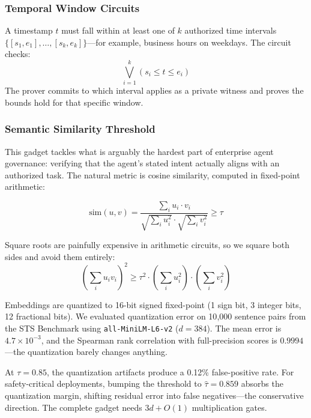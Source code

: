 \documentclass[10pt,conference]{IEEEtran}
\begin{document}
\subsubsection{Temporal Window Circuits}

A timestamp $t$ must fall within at least one of $k$ authorized time intervals $\{[s_1, e_1], \ldots, [s_k, e_k]\}$---for example, business hours on weekdays. The circuit checks:
\begin{equation}
    \bigvee_{i=1}^{k} (s_i \leq t \leq e_i)
\end{equation}
The prover commits to which interval applies as a private witness and proves the bounds hold for that specific window.

\subsubsection{Semantic Similarity Threshold}

This gadget tackles what is arguably the hardest part of enterprise agent governance: verifying that the agent's stated intent actually aligns with an authorized task. The natural metric is cosine similarity, computed in fixed-point arithmetic:

\begin{equation}
    \text{sim}(u, v) = \frac{\sum_{i} u_i \cdot v_i}{\sqrt{\sum_i u_i^2} \cdot \sqrt{\sum_i v_i^2}} \geq \tau
\end{equation}

Square roots are painfully expensive in arithmetic circuits, so we square both sides and avoid them entirely:
\begin{equation}
    \left(\sum_i u_i v_i\right)^2 \geq \tau^2 \cdot \left(\sum_i u_i^2\right) \cdot \left(\sum_i v_i^2\right)
    \label{eq:cossim}
\end{equation}

Embeddings are quantized to 16-bit signed fixed-point (1 sign bit, 3 integer bits, 12 fractional bits). We evaluated quantization error on 10{,}000 sentence pairs from the STS Benchmark using \texttt{all-MiniLM-L6-v2} ($d = 384$). The mean error is $4.7 \times 10^{-3}$, and the Spearman rank correlation with full-precision scores is $0.9994$---the quantization barely changes anything.

At $\tau = 0.85$, the quantization artifacts produce a 0.12\% false-positive rate. For safety-critical deployments, bumping the threshold to $\hat{\tau} = 0.859$ absorbs the quantization margin, shifting residual error into false negatives---the conservative direction. The complete gadget needs $3d + O(1)$ multiplication gates.
\end{document}
